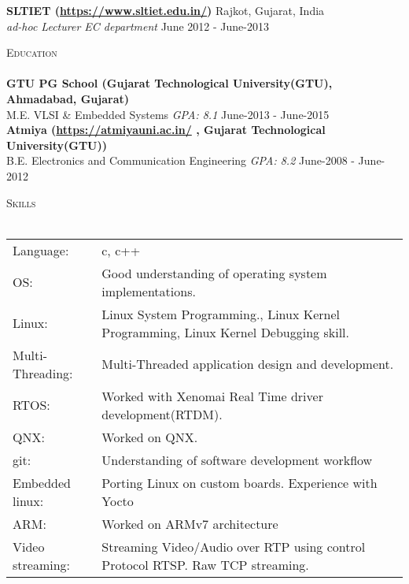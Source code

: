 \documentclass[a4paper]{article}
\newcommand{\lineunder} {
    \vspace*{-8pt} \\
    \hspace*{-18pt} \hrulefill \\
}
\newcommand{\header} [1] {
    {\hspace*{-18pt}\vspace*{6pt} \textsc{#1}}
    \vspace*{-6pt} \lineunder
}
\begin{document}
\textbf{SLTIET (\url{https://www.sltiet.edu.in/})} \hfill Rajkot, Gujarat, India\\
\textit{ad-hoc Lecturer EC department} \hfill June 2012 - June-2013 \\
\vspace{2mm}

\header{Education}
\textbf{GTU PG School (Gujarat Technological University(GTU), Ahmadabad, Gujarat)}\\
M.E. VLSI \& Embedded Systems \textit{GPA: 8.1} \hfill June-2013 - June-2015\\
\vspace{2mm}
\textbf{Atmiya (\url{https://atmiyauni.ac.in/} , Gujarat Technological University(GTU))}\\
B.E. Electronics and Communication Engineering \textit{GPA: 8.2} \hfill June-2008 - June-2012\\
\vspace{2mm}

\header{Skills}
\begin{tabular}{ l l }
	Language:        & c, c++                                                                             \\
	OS:              & Good understanding of operating system implementations.                            \\
	Linux:           & Linux System Programming., Linux Kernel Programming, Linux Kernel Debugging skill. \\
	Multi-Threading: & Multi-Threaded application design and development.                                 \\
	RTOS:            & Worked with Xenomai Real Time driver development(RTDM).                            \\
	QNX:			  & Worked on QNX. 																		 \\
	git:             & Understanding of software development workflow                                     \\
	Embedded linux:  & Porting Linux on custom boards. Experience with Yocto                              \\
	ARM:			 & Worked on ARMv7 architecture 														 \\
	Video streaming: & Streaming Video/Audio over RTP using control Protocol RTSP. Raw TCP streaming.     \\
\end{tabular}
\vspace{2mm}
\end{document}
